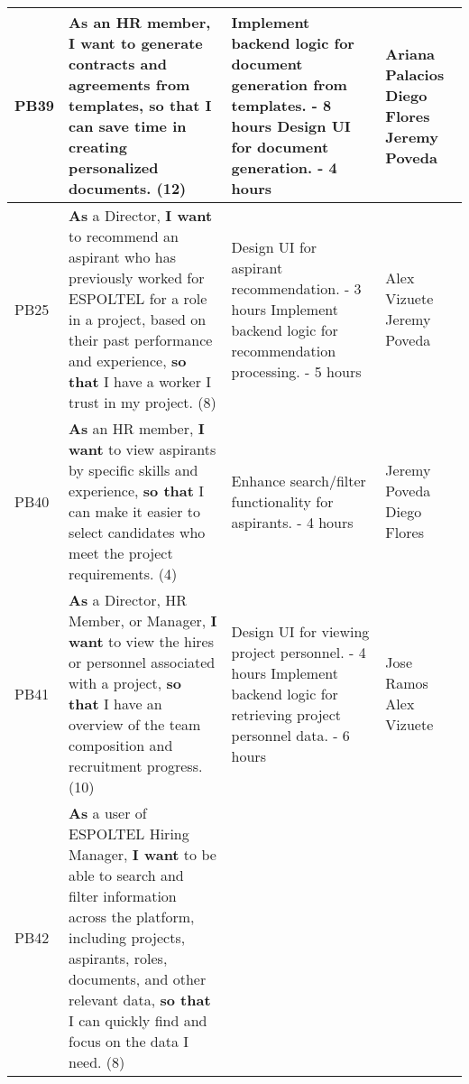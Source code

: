 \documentclass{scrreprt}
\begin{document}
\begin{longtable}{|p{1.5cm}|p{5.5cm}|p{4.5cm}|p{3cm}|}
	PB39 & \textbf{As} an HR member, \textbf{I want} to generate contracts and agreements from templates, \textbf{so that} I can save time in creating personalized documents. (12) &
	
	Implement backend logic for document generation from templates. - 8 hours \newline
	Design UI for document generation. - 4 hours &
	Ariana Palacios \newline
	Diego Flores \newline
	Jeremy Poveda \\ \hline
	
	PB25 & \textbf{As} a Director, \textbf{I want} to recommend an aspirant who has previously worked for ESPOLTEL for a role in a project, based on their past performance and experience, \textbf{so that} I have a worker I trust in my project. (8) &
	
	Design UI for aspirant recommendation. - 3 hours \newline
	Implement backend logic for recommendation processing. - 5 hours &
	Alex Vizuete \newline
	Jeremy Poveda \\ \hline
	
	PB40 & \textbf{As} an HR member, \textbf{I want} to view aspirants by specific skills and experience, \textbf{so that} I can make it easier to select candidates who meet the project requirements. (4) &
	
	Enhance search/filter functionality for aspirants. - 4 hours &
	Jeremy Poveda \newline
	Diego Flores \\ \hline
	
	PB41 & \textbf{As} a Director, HR Member, or Manager, \textbf{I want} to view the hires or personnel associated with a project, \textbf{so that} I have an overview of the team composition and recruitment progress. (10) &
	
	Design UI for viewing project personnel. - 4 hours \newline
	Implement backend logic for retrieving project personnel data. - 6 hours &
	Jose Ramos \newline
	Alex Vizuete \\ \hline
	
	PB42 & \textbf{As} a user of ESPOLTEL Hiring Manager, \textbf{I want} to be able to search and filter information across the platform, including projects, aspirants, roles, documents, and other relevant data, \textbf{so that} I can quickly find and focus on the data I need. (8) &
	

\end{longtable}
\end{document}
